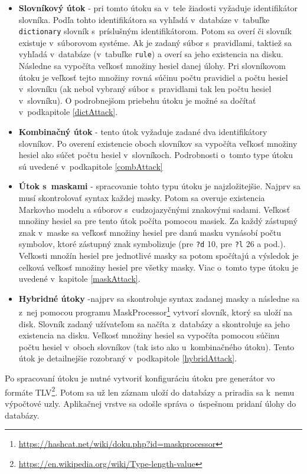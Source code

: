 \documentclass[slovak]{fitthesis}
\begin{document}
\begin{itemize}
    \item \textbf{Slovníkový útok} - pri tomto útoku sa v~tele žiadosti vyžaduje identifikátor slovníka. Podľa tohto identifikátora sa vyhľadá v~databáze v~tabuľke \texttt{dictionary} slovník s~príslušným identifikátorom. Potom sa overí či slovník existuje v~súborovom systéme. Ak je zadaný súbor s~pravidlami, taktiež sa vyhľadá v~databáze (v~tabuľke \texttt{rule}) a overí sa jeho existencia na disku. Následne sa vypočíta veľkosť množiny hesiel danej úlohy. Pri slovníkovom útoku je veľkosť tejto množiny rovná súčinu počtu pravidiel a počtu hesiel v~slovníku (ak nebol vybraný súbor s~pravidlami tak len počtu hesiel v~slovníku). O podrobnejšom priebehu útoku je možné sa dočítať v~podkapitole \ref{dictAttack}.
    \item \textbf{Kombinačný útok} - tento útok vyžaduje zadané dva identifikátory slovníkov. Po overení existencie oboch slovníkov sa vypočíta veľkosť množiny hesiel ako súčet počtu hesiel v~slovníkoch. Podrobnosti o~tomto type útoku sú uvedené v~podkapitole \ref{combAttack}
    \item \textbf{Útok s~maskami} - spracovanie tohto typu útoku je najzložitejšie. Najprv sa musí skontrolovať syntax každej masky. Potom sa overuje existencia Markovho modelu a súborov s~cudzojazyčnými znakovými sadami. Veľkosť množiny hesiel sa pre tento útok počíta pomocou masiek. Za každý zástupný znak v~maske sa veľkosť množiny hesiel pre danú masku vynásobí počtu symbolov, ktoré zástupný znak symbolizuje (pre \texttt{?d} 10, pre \texttt{?l} 26 a pod.). Veľkosti množín hesiel pre jednotlivé masky sa potom spočítajú a výsledok je celková veľkosť množiny hesiel pre všetky masky. Viac o~tomto type útoku je uvedené v~kapitole \ref{maskAttack}.
    \item \textbf{Hybridné útoky} -najprv sa skontroluje syntax zadanej masky a následne sa z~nej pomocou programu MaskProcessor\footnote{\url{https://hashcat.net/wiki/doku.php?id=maskprocessor}} vytvorí slovník, ktorý sa uloží na disk. Slovník zadaný užívateľom sa načíta z~databázy a skontroluje sa jeho existencia na disku. Veľkosť množiny hesiel sa vypočíta pomocou súčinu počtu hesiel v~oboch slovníkov (tak isto ako u~kombinačného útoku). Tento útok je detailnejšie rozobraný v~podkapitole \ref{hybridAttack}.
\end{itemize}
Po spracovaní útoku je nutné vytvoriť konfiguráciu útoku pre generátor vo formáte TLV\footnote{\url{https://en.wikipedia.org/wiki/Type-length-value}}. Potom sa už len záznam uloží do databázy a priradia sa k~nemu výpočtové uzly. Aplikačnej vrstve sa odošle správa o~úspešnom pridaní úlohy do databázy.
\end{document}
